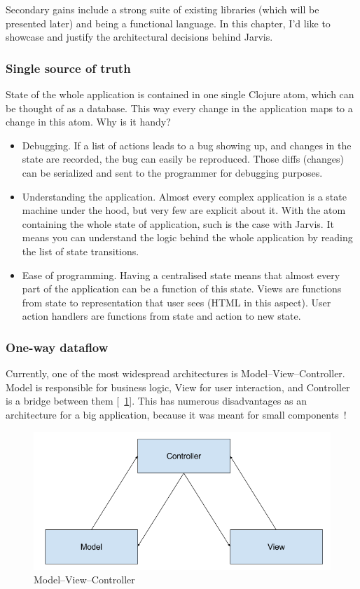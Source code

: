 \documentclass[english,mgr,shortabstract]{iithesis}
\newcommand*{\figref}[1]{[\textbf{\figurename}~\ref{#1}]}
\begin{document}
Secondary gains include a strong suite of existing libraries (which will be
presented later) and being a functional language.
In this chapter, I’d like to showcase and justify the architectural decisions
behind Jarvis.

\subsubsection{Single source of truth}
State of the whole application is contained in one single Clojure atom, which
can be thought of as a database.
This way every change in the application maps to a change in this atom.
Why is it handy?
\begin{itemize}
\item Debugging. If a list of actions leads to a bug showing up, and changes in
  the state are recorded, the bug can easily be reproduced. Those diffs
  (changes) can be serialized and sent to the programmer for debugging purposes.
\item Understanding the application. Almost every complex application is a state
  machine under the hood, but very few are explicit about it. With the atom
  containing the whole state of application, such is the case with Jarvis. It
  means you can understand the logic behind the whole application by reading the
  list of state transitions.
\item Ease of programming. Having a centralised state
  means that almost every part of the application can be a function of this
  state. Views are functions from state to representation that user sees (HTML
  in this aspect). User action handlers are functions from state and action to
  new state.
\end{itemize}

\subsubsection{One-way dataflow}
Currently, one of the most widespread architectures is Model--View--Controller.
Model is responsible for business logic, View for user interaction, and
Controller is a bridge between them \figref{fig:mvc}.
This has numerous disadvantages as an architecture for a big application,
because it was meant for small components~\cite{Krasner:1988:CUM:50757.50759}!

\begin{figure}[hbt]
  \centering
  \includegraphics[scale=0.25]{img/MVC}
  \caption{Model--View--Controller}
\label{fig:mvc}
\end{figure}
\end{document}
